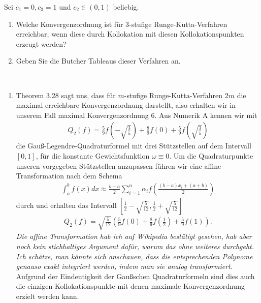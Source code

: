 \begin{exercise}
Sei $c_1 = 0, c_3 = 1$ und $c_2 \in (0,1)$ beliebig.
\begin{enumerate}[label = \textbf{\alph*)}]
  \item Welche Konvergenzordnung ist für 3-stufige Runge-Kutta-Verfahren erreichbar,
  wenn diese durch Kollokation mit diesen Kollokationspunkten erzeugt werden?
  \item Geben Sie die Butcher Tableaus dieser Verfahren an.
\end{enumerate}
\end{exercise}
\begin{solution}
\leavevmode \\
\begin{enumerate}[label = \textbf{\alph*)}]
  \item Theorem 3.28 sagt uns, dass für $m$-stufige Runge-Kutta-Verfahren $2m$ die maximal
  erreichbare Konvergenzordnung darstellt, also erhalten wir in unserem Fall maximal Konvergenzordnung 6.
  Aus Numerik A kennen wir mit
  \begin{align*}
    Q_2(f) = \frac{5}{9}f\left(-\sqrt{\frac{3}{5}}\right) + \frac{8}{9}f\left(0\right)
    + \frac{5}{9}f\left(\sqrt{\frac{3}{5}}\right)
  \end{align*}
  die Gauß-Legendre-Quadraturformel mit drei Stützstellen auf dem Intervall $[0,1]$,
  für die konstante Gewichtsfunktion $\omega \equiv 0$. Um die Quadraturpunkte unseren
  vorgegeben Stützstellen anzupassen führen wir eine affine Transformation nach dem Schema
  \begin{align*}
    \int_a^b f(x)dx \approx \frac{b-a}{2}\sum_{i = 1}^n\alpha_i f\left(\frac{(b-a)x_i + (a+b)}{2}\right)
  \end{align*}
  durch und erhalten das Intervall $\left[\frac{1}{2} - \sqrt{\frac{5}{12}}, \frac{1}{2} + \sqrt{\frac{5}{12}}\right]$
  \begin{align*}
  Q_2(f) = \sqrt{\frac{5}{12}}\left(\frac{5}{9}f(0) + \frac{8}{9}f\left(\frac{1}{2}\right)
  + \frac{5}{9}f(1)\right).
  \end{align*}
  \textit{Die affine Transformation hab ich auf Wikipedia bestätigt gesehen, hab
  aber noch kein stichhaltiges Argument dafür, warum das ohne weiteres durchgeht.
  Ich schätze, man könnte sich anschauen, dass die entsprechenden Polynome genauso exakt
  integriert werden, indem man sie analog transformiert.}
  Aufgrund der Eindeutigkeit der Gaußschen Quadraturformeln sind dies auch die
  einzigen Kollokationspunkte mit denen maximale Konvergenzordnung erzielt werden kann.

\end{enumerate}
\end{solution}
